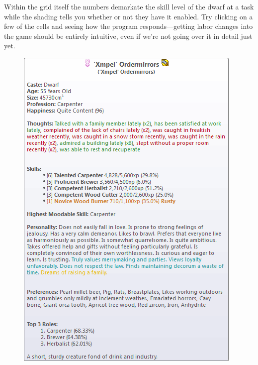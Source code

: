 \documentclass[]{article}
\begin{document}
Within the grid itself the numbers demarkate the skill level of the dwarf at a task while the shading
tells you whether or not they have it enabled. Try clicking on a few of the cells and seeing how the
program responds---getting labor changes into the game should be entirely intuitive, even if we're not
going over it in detail just yet.

\newpage

\begin{figure}
\vspace{-10pt}
  \begin{center}
    \includegraphics[scale=.8]{Sec1Fig8}
  \end{center}
\end{figure}
\end{document}
